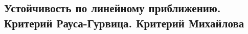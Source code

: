 

\subsection{Устойчивость по линейному приближению. Критерий Рауса-Гурвица. Критерий Михайлова}



